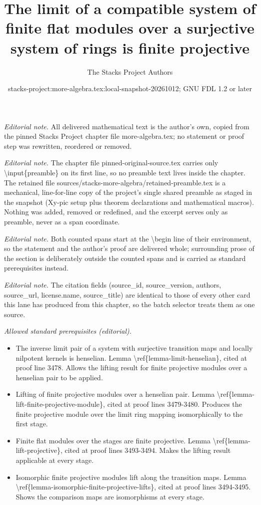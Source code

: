 \documentclass[10pt,a4paper]{amsart}
\title{The limit of a compatible system of finite flat modules over a surjective system of rings is finite projective}
\author{The Stacks Project Authors}
\date{stacks-project:more-algebra.tex:local-snapshot-20261012; GNU FDL 1.2 or later}
\theoremstyle{plain}
\theoremstyle{definition}
\theoremstyle{remark}
\numberwithin{equation}{subsection}
\begin{document}
\maketitle
\setcounter{subsection}{1}
\noindent\textit{Editorial note.} All delivered mathematical text is the author's own, copied from the pinned Stacks Project chapter file more-algebra.tex; no statement or proof step was rewritten, reordered or removed.\par\medskip
\noindent\textit{Editorial note.} The chapter file pinned-original-source.tex carries only \textbackslash{}input\{preamble\} on its first line, so no preamble text lives inside the chapter. The retained file sources/stacks-more-algebra/retained-preamble.tex is a mechanical, line-for-line copy of the project's single shared preamble as staged in the snapshot (Xy-pic setup plus theorem declarations and mathematical macros). Nothing was added, removed or redefined, and the excerpt serves only as preamble, never as a span coordinate.\par\medskip
\noindent\textit{Editorial note.} Both counted spans start at the \textbackslash{}begin line of their environment, so the statement and the author's proof are delivered whole; surrounding prose of the section is deliberately outside the counted spans and is carried as standard prerequisites instead.\par\medskip
\noindent\textit{Editorial note.} The citation fields (source\_id, source\_version, authors, source\_url, license.name, source\_title) are identical to those of every other card this lane has produced from this chapter, so the batch selector treats them as one source.\par\medskip
\noindent\textit{Allowed standard prerequisites (editorial).}\begin{itemize}
\item The inverse limit pair of a system with surjective transition maps and locally nilpotent kernels is henselian. Lemma \textbackslash{}ref\{lemma-limit-henselian\}, cited at proof line 3478. Allows the lifting result for finite projective modules over a henselian pair to be applied.
\item Lifting of finite projective modules over a henselian pair. Lemma \textbackslash{}ref\{lemma-lift-finite-projective-module\}, cited at proof lines 3479-3480. Produces the finite projective module over the limit ring mapping isomorphically to the first stage.
\item Finite flat modules over the stages are finite projective. Lemma \textbackslash{}ref\{lemma-lift-projective\}, cited at proof lines 3493-3494. Makes the lifting result applicable at every stage.
\item Isomorphic finite projective modules lift along the transition maps. Lemma \textbackslash{}ref\{lemma-isomorphic-finite-projective-lifts\}, cited at proof lines 3494-3495. Shows the comparison maps are isomorphisms at every stage.
\end{itemize}\medskip
\end{document}
